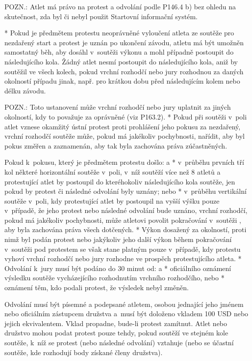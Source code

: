   POZN.: Atlet má právo na protest a odvolání podle P146.4 b) bez ohledu na skutečnost, zda byl či nebyl použit Startovní informační systém.

  * Pokud je předmětem protestu neoprávněné vyloučení atleta ze soutěže pro nezdařený start a protest je uznán po ukončení závodu, atletu má být umožněn samostatný běh, aby dosáhl v~soutěži výkonu a mohl případně postoupit do následujícího kola. Žádný atlet nesmí postoupit do následujícího kola, aniž by soutěžil ve všech kolech, pokud vrchní rozhodčí nebo jury rozhodnou za daných okolností případu jinak, např. pro krátkou dobu před následujícím kolem nebo délku závodu.

  POZN.: Toto ustanovení může vrchní rozhodčí nebo jury uplatnit za jiných okolností, kdy to považuje za oprávněné (viz P163.2).
  \enditems
* Pokud při soutěži v~poli atlet vznese okamžitý ústní protest proti prohlášení jeho pokusu za nezdařený, vrchní rozhodčí soutěže může, pokud má jakékoliv pochybnosti, nařídit, aby byl pokus změřen a zaznamenán, aby tak byla zachována práva zúčastněných.

Pokud k~pokusu, který je předmětem protestu došlo:
  \begitems \style a
  * v~průběhu prvních tří kol některé horizontální soutěže v~poli, v~níž soutěží více než 8 atletů a protestující atlet by postoupil do kteréhokoliv následujícího kola soutěže, jen pokud by protest či následné odvolání byly uznány; nebo
  * v~průběhu vertikální soutěže v~poli, kdy protestující atlet by postoupil na vyšší výšku pouze v~případě, že jeho protest nebo následné odvolání bude uznáno, vrchní rozhodčí, pokud má jakékoliv pochybnosti, může atletovi povolit pokračování v~soutěži , aby byla zachována práva všech dotčených.
  \enditems
* Výkon dosažený za okolností, proti nimž byl podán protest nebo jakýkoliv jeho další výkon během pokračování v~soutěži pod protestem se však stane platným pouze v~případě, kdy protestu vyhoví vrchní rozhodčí nebo jury rozhodne ve prospěch protestujícího atleta.
* Odvolání k~jury musí být podáno do 30 minut od:
  \begitems \style a
  * oficiálního oznámení výsledku soutěže vycházejícího rozhodnutím vrchního rozhodčího, nebo
  * oznámení těm, kdo podali protest, že výsledek nebyl změněn.
  \enditems

Odvolání musí být písemné a podepsané atletem, osobou jednající jeho jménem nebo oficiálním zástupcem družstva a~musí být doloženo vkladem 100 USD nebo jejich ekvivalentem. Vklad propadne, bude-li protest zamítnut. Atlet nebo družstvo mohou podat protest pouze tehdy, pokud soutěží ve stejném kole soutěže, k~níž se protest (nebo následné odvolání) vztahuje (nebo se účastní soutěže, kde rozhodují body získané členy družstva).

